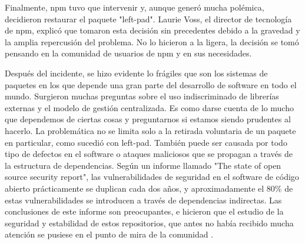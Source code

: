 Finalmente, npm tuvo que intervenir y, aunque generó mucha polémica, decidieron restaurar el paquete "left-pad". Laurie Voss, el director de tecnología de npm, explicó que tomaron esta decisión sin precedentes debido a la gravedad y la amplia repercusión del problema. No lo hicieron a la ligera, la decisión se tomó pensando en la comunidad de usuarios de npm y en sus necesidades.


Después del incidente, se hizo evidente lo frágiles que son los sistemas de paquetes en los que depende una gran parte del desarrollo
de software en todo el mundo.
Surgieron muchas preguntas sobre el uso indiscriminado de librerías externas \cite{10.1145/3106237.3106267} y el modelo de gestión centralizada.
Es como darse cuenta de lo mucho que dependemos de ciertas cosas y preguntarnos si estamos siendo prudentes al hacerlo.
La problemática no se limita solo a la retirada voluntaria de un paquete en particular, como sucedió con left-pad.
También puede ser causada por todo tipo de defectos en el software o ataques maliciosos que se propagan a través de la estructura de dependencias.
Según un informe llamado "The state of open source security report", las vulnerabilidades de seguridad en el software de código abierto
prácticamente se duplican cada dos años, y aproximadamente el 80\% de estas vulnerabilidades se introducen a través de dependencias indirectas.
Las conclusiones de este informe son preocupantes, e hicieron que el estudio de la seguridad y estabilidad de estos repositorios, que antes no había
recibido mucha atención se pusiese en el punto de mira de la comunidad \cite{10.5555/2820518.2820524} \cite{10.1145/3196398.3196401} \cite{BogartChristopherKastner2015}.


